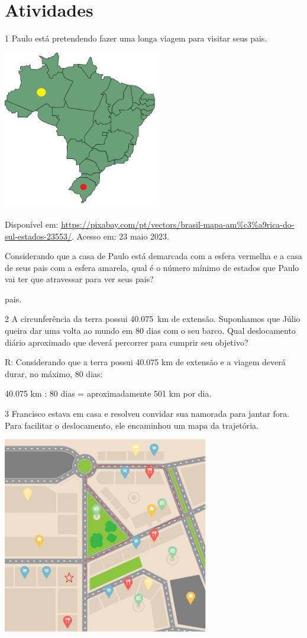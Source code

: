 {\section{Atividades}

\num{1} Paulo está pretendendo fazer uma longa viagem para visitar seus pais.

\includegraphics[width=2.73952in,height=2.725in]{./imgSAEB_8_MAT/media/image36.png}

Disponível em:
\url{https://pixabay.com/pt/vectors/brasil-mapa-am\%c3\%a9rica-do-sul-estados-23553/}.
Acesso em: 23 maio 2023.

Considerando que a casa de Paulo está demarcada com a esfera vermelha e
a casa de seus pais com a esfera amarela, qual é o número mínimo de
estados que Paulo vai ter que atravessar para ver seus pais?

pais.

\num{2} A circunferência da terra possui 40.075~km de extensão. Suponhamos
que Júlio queira dar uma volta ao mundo em 80 dias com o seu barco. Qual
deslocamento diário aproximado que deverá percorrer para cumprir seu
objetivo?

R: Considerando que a terra possui 40.075 km de extensão e a viagem deverá
durar, no máximo, 80 dias:

40.075 km : 80 dias = aproximadamente 501 km por dia.

\num{3} Francisco estava em casa e resolveu convidar sua namorada para jantar
fora. Para facilitar o deslocamento, ele encaminhou um mapa da
trajetória.

\includegraphics[width=3.55in,height=3.406in]{./imgSAEB_8_MAT/media/image37.png}

}
